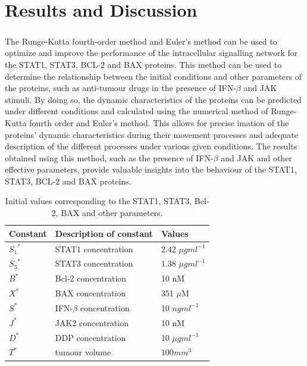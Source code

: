 \chapter{Results and Discussion}
\label{chap:05}
\paragraph{}

The Runge-Kutta fourth-order method  and Euler's method can be used to optimize and improve the performance of the intracellular signalling network for the STAT1, STAT3, BCL-2 and BAX proteins. This method can be used to determine the relationship between the initial conditions and other parameters of the proteins, such as anti-tumour drugs in the presence of IFN-$\beta$ and JAK stimuli. By doing so, the dynamic characteristics of the proteins can be predicted under different conditions and calculated using the numerical method of Runge-Kutta fourth order and Euler's method. This allows for precise \cite{lee2021mathematical}imation of the proteins' dynamic characteristics during their movement processes and adequate description of the different processes under various given conditions. The results obtained using this method, such as  the presence of IFN-$\beta$ and JAK and other effective parameters, provide valuable insights into the behaviour of the STAT1, STAT3, BCL-2 and BAX proteins.


\begin{table}[hbt!]
\begin{center}
    \begin{tabular}{p{2cm}|p{6cm}|p{3cm}}
    \hline
    \textbf{Constant} & \textbf{Description of constant} & \textbf{Values}
    \\
    \hline \hline
 ${S_1}^*$&STAT1 concentration&2.42 $\mu g ml^{-1}$\\
${S_3}^*$&STAT3 concentration&1.38 $\mu g ml^{-1}$\\
$B^*$&Bcl-2 concentration&10 nM \\
$X^*$&BAX concentration&351  $\mu$M\\
$S^*$&IFN-$\beta$ concentration&10 $ng ml^{-1}$\\
$J^*$&JAK2 concentration&10 nM\\
$D^*$&DDP concentration&10 $\mu g ml^{-1}$\\
$T^*$&tumour volume&$100mm^3$\\
     \hline
    \end{tabular}
    \caption{Initial values corresponding to the STAT1, STAT3, Bcl-2, BAX and other parameters.  }
    \label{tab1}
    \end{center}
\end{table}

